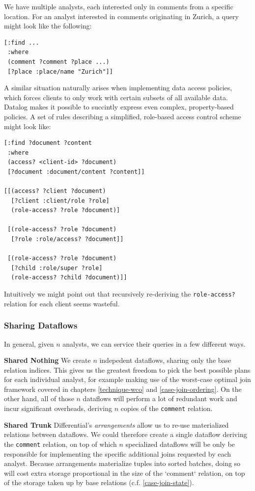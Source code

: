 \documentclass[../catalog.tex]{subfiles}
\begin{document}
We have multiple analysts, each interested only in comments from a
specific location. For an analyst interested in comments originating
in Zurich, a query might look like the following:

\begin{verbatim}
[:find ...
 :where
 (comment ?comment ?place ...)
 [?place :place/name "Zurich"]]
\end{verbatim}

A similar situation naturally arises when implementing data access
policies, which forces clients to only work with certain subsets of
all available data. Datalog makes it possible to succintly express
even complex, property-based policies. A set of rules describing a
simplified, role-based access control scheme might look like:

\begin{verbatim}
[:find ?document ?content
 :where
 (access? <client-id> ?document)
 [?document :document/content ?content]]

[[(access? ?client ?document)
  [?client :client/role ?role]
  (role-access? ?role ?document)]

 [(role-access? ?role ?document)
  [?role :role/access? ?document]]
 
 [(role-access? ?role ?document)
  [?child :role/super ?role]
  (role-access? ?child ?document)]]
\end{verbatim}

Intuitively we might point out that recursively re-deriving the
\texttt{role-access?} relation for each client seems wasteful.

\subsubsection{Sharing Dataflows}

In general, given $n$ analysts, we can service their queries in a few
different ways.

\textbf{Shared Nothing} We create $n$ indepedent dataflows, sharing
only the base relation indices. This gives us the greatest freedom to
pick the best possible plans for each individual analyst, for example
making use of the worst-case optimal join framework covered in
chapters \ref{technique-wco} and \ref{case-join-ordering}. On the
other hand, all of those $n$ dataflows will perform a lot of redundant
work and incur significant overheads, deriving $n$ copies of the
\texttt{comment} relation.

\textbf{Shared Trunk} Differential's \emph{arrangements} allow us to
re-use materialized relations between dataflows. We could therefore
create a single dataflow deriving the \texttt{comment} relation, on
top of which $n$ specialized dataflows will be only be responsible for
implementing the specific additional joins requested by each
analyst. Because arrangements materialize tuples into sorted batches,
doing so will cost extra storage proportional in the size of the
`comment` relation, on top of the storage taken up by base relations
(c.f. \ref{case-join-state}).
\end{document}
